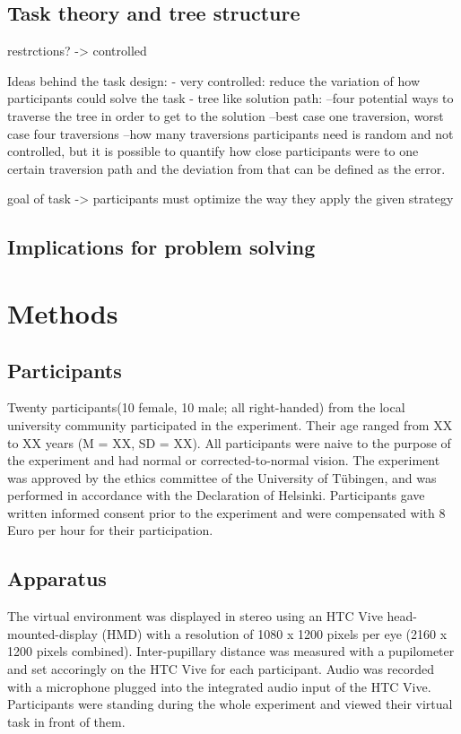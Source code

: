 \documentclass{article}
\begin{document}
\subsection{Task theory and tree structure}
restrctions? -> controlled

Ideas behind the task design:	
- very controlled: reduce the variation of how participants could solve the task
- tree like solution path: 
--four potential ways to traverse the tree in order to get to the solution
--best case one traversion, worst case four traversions
--how many traversions participants need is random and not controlled, but it is possible to quantify how close participants were to one certain traversion path and the deviation from that can be defined as the error.

goal of task -> participants must optimize the way they apply the given strategy
\subsection{Implications for problem solving}

\section{Methods}

\subsection{Participants}
Twenty participants(10 female, 10 male; all right-handed) from the local university community participated in the experiment. Their age ranged from XX to XX years (M = XX, SD = XX). All participants were naive to the purpose of the experiment and had normal or corrected-to-normal vision. The experiment was approved by the ethics committee of the University of T\"ubingen, and was performed in accordance with the Declaration of Helsinki. Participants gave written informed consent prior to the experiment and were compensated with 8 Euro per hour for their participation. 

\subsection{Apparatus}
The virtual environment was displayed in stereo using an HTC Vive head-mounted-display (HMD) with a resolution of 1080 x 1200 pixels per eye (2160 x 1200 pixels combined). Inter-pupillary distance was measured with a pupilometer and set accoringly on the HTC Vive for each participant. Audio was recorded with a microphone plugged into the integrated audio input of the HTC Vive. Participants were standing during the whole experiment and viewed their virtual task in front of them.
\end{document}
